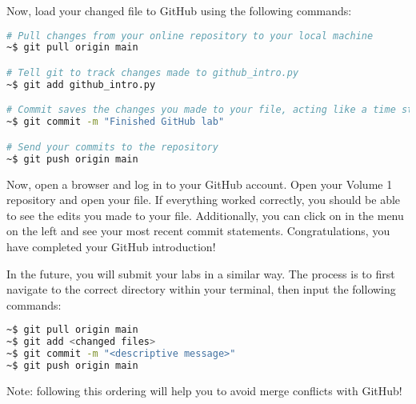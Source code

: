 Now, load your changed file to GitHub using the following commands:

\begin{lstlisting}[language=bash]
# Pull changes from your online repository to your local machine
~$ git pull origin main

# Tell git to track changes made to github_intro.py
~$ git add github_intro.py

# Commit saves the changes you made to your file, acting like a time stamp
~$ git commit -m "Finished GitHub lab"

# Send your commits to the repository
~$ git push origin main
\end{lstlisting}

Now, open a browser and log in to your GitHub account.
Open your Volume 1 repository and open your  file.
If everything worked correctly, you should be able to see the edits you made to your file.
Additionally, you can click on  in the menu on the left and see your most recent commit statements.
Congratulations, you have completed your GitHub introduction!

In the future, you will submit your labs in a similar way.
The process is to first navigate to the correct directory within your terminal, then input the following commands:

\begin{lstlisting}[language=bash]
~$ git pull origin main
~$ git add <changed files>
~$ git commit -m "<descriptive message>"
~$ git push origin main
\end{lstlisting}

Note: following this ordering will help you to avoid merge conflicts with GitHub!
